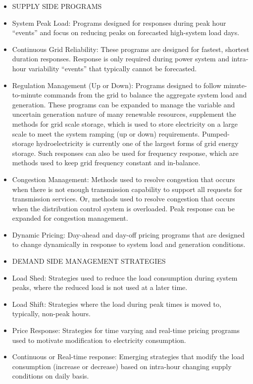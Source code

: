 \begin{itemize}
\item SUPPLY SIDE PROGRAMS
\item System Peak Load: Programs designed for responses during peak hour “events” and focus on reducing peaks on 
forecasted high-system load days. 
\item Continuous Grid Reliability: These programs are designed for fastest, shortest duration responses. 
Response is only required during power system and intra-hour variability “events” that typically cannot be forecasted.
\item Regulation Management (Up or Down): Programs designed to follow minute-to-minute commands from the grid to 
balance the aggregate system load and generation. These programs can be expanded to manage the variable and 
uncertain generation nature of many renewable resources, supplement the methods for grid scale storage, which is 
used to store electricity on a large scale to meet the system ramping (up or down) requirements. Pumped-storage 
hydroelectricity is currently one of the largest forms of grid energy storage. Such 
responses can also be used for frequency response, which are methods used to keep grid frequency constant 
and in-balance.
\item Congestion Management: Methods used to resolve congestion that occurs when there is not enough transmission 
capability to support all requests for transmission services.  Or, methods used to resolve congestion 
that occurs when the distribution control system is overloaded. Peak response can be expanded for 
congestion management.
\item Dynamic Pricing: Day-ahead and day-off pricing programs that are designed to change dynamically in response 
to system load and generation conditions.  
\item DEMAND SIDE MANAGEMENT STRATEGIES
\item Load Shed: Strategies used to reduce the load consumption during system peaks, 
where the reduced load is not used at a later time.
\item Load Shift:  Strategies where the load during peak times is moved to, typically, non-peak hours.
\item Price Response:  Strategies for time varying and real-time pricing programs used to motivate modification 
to electricity consumption. 
\item Continuous or Real-time response: Emerging strategies that modify the load consumption (increase or decrease) 
based on intra-hour changing supply conditions on daily basis.
\end{itemize}

